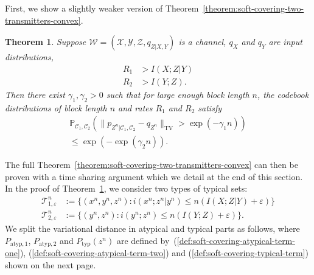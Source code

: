 \documentclass[journal]{IEEEtran}
\newcommand{\channelpmf}{q}
\newcommand{\codebookpmf}{p}
\newcommand{\codebookRateOne}{R_1}
\newcommand{\codebookRateTwo}{R_2}
\newcommand{\channelInOne}{X}
\newcommand{\channelInOneAlph}{\mathcal{X}}
\newcommand{\channelInOneAlphElement}{x}
\newcommand{\channelInTwo}{Y}
\newcommand{\channelInTwoAlph}{\mathcal{Y}}
\newcommand{\channelInTwoAlphElement}{y}
\newcommand{\channelOut}{Z}
\newcommand{\channelOutAlph}{\mathcal{Z}}
\newcommand{\channelOutAlphElement}{z}
\newcommand{\channel}{\mathcal{W}}
\newcommand{\codebookOne}{\mathcal{C}_1}
\newcommand{\codebookTwo}{\mathcal{C}_2}
\newcommand{\codebookBlocklength}{n}
\newcommand{\mutualInformation}[2]{I(#1;#2)}
\newcommand{\mutualInformationConditional}[3]{I(#1;#2|#3)}
\newcommand{\finalconstOne}{\gamma_1}
\newcommand{\finalconstTwo}{\gamma_2}
\newcommand{\totalvariation}[1]{\lVert #1 \rVert_\mathrm{TV}}
\newcommand{\informationDensity}[2]{i({#1};{#2})}
\newcommand{\informationDensityConditional}[3]{i({#1};{#2} | {#3})}
\newcommand{\Probability}{\mathbb{P}}
\newcommand{\typicalityParam}{\varepsilon}
\newcommand{\typicalSetIndex}[3]{\mathcal{T}_{#3,#1}^{#2}}
\newcommand{\totvarAtypicalOne}{P_{\mathrm{atyp}, 1}}
\newcommand{\totvarAtypicalTwo}{P_{\mathrm{atyp}, 2}}
\newcommand{\totvarTypical}[1]{P_{\mathrm{typ}}({#1})}
\newtheorem{theorem}{Theorem}
\begin{document}
First, we show a slightly weaker version of Theorem~\ref{theorem:soft-covering-two-transmitters-convex}.
\begin{theorem}
\label{theorem:soft-covering-two-transmitters}
Suppose
$\channel = (\channelInOneAlph, \channelInTwoAlph, \channelOutAlph, \channelpmf_{\channelOut | \channelInOne, \channelInTwo})$
is a channel, $\channelpmf_\channelInOne$ and $\channelpmf_\channelInTwo$ are input distributions,
\begin{align*}
\codebookRateOne &> \mutualInformationConditional{\channelInOne}{\channelOut}{\channelInTwo}
\\
\codebookRateTwo &> \mutualInformation{\channelInTwo}{\channelOut}.
\end{align*}
Then there exist $\finalconstOne, \finalconstTwo > 0$ such that for large enough block length $\codebookBlocklength$, the codebook distributions of block length $\codebookBlocklength$ and rates $\codebookRateOne$ and $\codebookRateTwo$ satisfy
\begin{multline}
\label{theorem:soft-covering-two-transmitters-probability-statement}
\Probability_{\codebookOne, \codebookTwo} \left(
  \totalvariation{
    \codebookpmf_{\channelOut^\codebookBlocklength | \codebookOne, \codebookTwo} - \channelpmf_{\channelOut^\codebookBlocklength}
  }
  >
  \exp(-\finalconstOne\codebookBlocklength)
\right)
\\
\leq
\exp\left(-\exp\left(\finalconstTwo\codebookBlocklength\right)\right).
\end{multline}
\end{theorem}
The full Theorem~\ref{theorem:soft-covering-two-transmitters-convex} can then be proven with a time sharing argument which we detail at the end of this section. In the proof of Theorem~\ref{theorem:soft-covering-two-transmitters}, we consider two types of typical sets:
\begin{align*}
  \typicalSetIndex{\typicalityParam}{\codebookBlocklength}{1}
  &:=
  \{
    (\channelInOneAlphElement^\codebookBlocklength, \channelInTwoAlphElement^\codebookBlocklength,\channelOutAlphElement^\codebookBlocklength)
    :
    \informationDensityConditional{\channelInOneAlphElement^\codebookBlocklength}{\channelOutAlphElement^\codebookBlocklength}{\channelInTwoAlphElement^\codebookBlocklength}
    \leq
    \codebookBlocklength(\mutualInformationConditional{\channelInOne}{\channelOut}{\channelInTwo}+\typicalityParam)
  \}
\\
   \typicalSetIndex{\typicalityParam}{\codebookBlocklength}{2}
   &:=
   \{
     (\channelInTwoAlphElement^\codebookBlocklength,\channelOutAlphElement^\codebookBlocklength)
     :
     \informationDensity{\channelInTwoAlphElement^\codebookBlocklength}{\channelOutAlphElement^\codebookBlocklength}
    \leq
    \codebookBlocklength(\mutualInformation{\channelInTwo}{\channelOut}+\typicalityParam)
  \}.
\end{align*}
We split the variational distance in atypical and typical parts as follows, where $\totvarAtypicalOne$, $\totvarAtypicalTwo$ and $\totvarTypical{\channelOutAlphElement^\codebookBlocklength}$ are defined by~(\ref{def:soft-covering-atypical-term-one}), (\ref{def:soft-covering-atypical-term-two}) and (\ref{def:soft-covering-typical-term}) shown on the next page.
\end{document}
